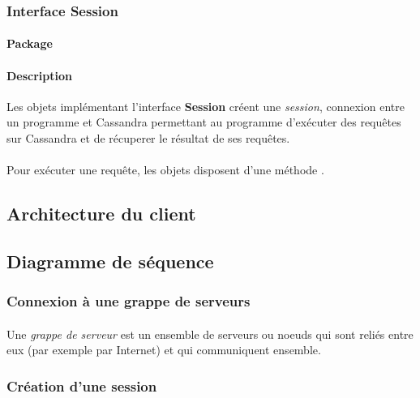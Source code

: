 \documentclass[12pt]{article}
\begin{document}
\subsubsection{Interface Session}

\paragraph{Package}  

\paragraph{Description} Les objets implémentant l'interface \textbf{Session} créent une \textit{session}, connexion entre un programme et Cassandra permettant au programme d'exécuter des requêtes sur Cassandra et de récuperer le résultat de ses requêtes.

\paragraph{} Pour exécuter une requête, les objets disposent d'une méthode .



\subsection{Architecture du client}



\subsection{Diagramme de séquence}



\subsubsection{Connexion à une grappe de serveurs}

\paragraph{} Une \textit{grappe de serveur} est un ensemble de serveurs ou noeuds qui sont reliés entre eux (par exemple par Internet) et qui communiquent ensemble.

\subsubsection{Création d'une session}
\end{document}
